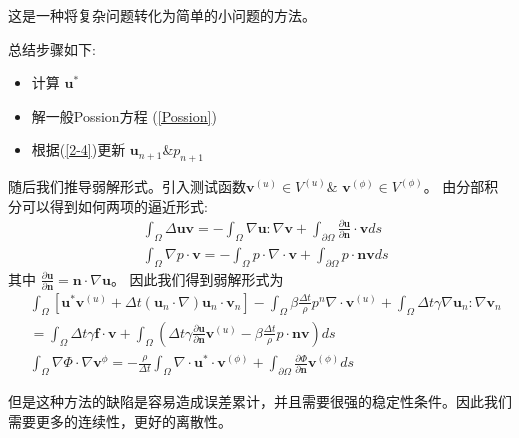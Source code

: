 这是一种将复杂问题转化为简单的小问题的方法。
\begin{tcolorbox}
    总结步骤如下:
    \begin{itemize}
        \item 计算 $\textbf{u}^*$
        \item 解一般Possion方程 (\ref*{Possion})
        \item 根据(\ref{2-4})更新 $\textbf{u}_{n+1}$\&$p_{n+1}$
    \end{itemize}
\end{tcolorbox}


随后我们推导弱解形式。引入测试函数$\textbf{v}^{(u)}\in V^{(u)}$\& $\textbf{v}^{(\phi)}\in V^{(\phi)}$。
由分部积分可以得到如何两项的逼近形式:
$$\begin{aligned}
    &\int_\Omega\Delta \textbf{u}\textbf{v}=-\int_\Omega\nabla\textbf{u}:\nabla\textbf{v}+\int_{\partial\Omega}\frac{\partial \textbf{u}}{\partial \textbf{n}}\cdot \textbf{v}ds\\
    &\int_\Omega \nabla p\cdot \textbf{v}=-\int_\Omega p\cdot \nabla \cdot \textbf{v}+\int_{\partial \Omega}p\cdot\textbf{n}\textbf{v}ds
\end{aligned}$$
其中 $\frac{\partial \textbf{u}}{\partial \textbf{n}}=\textbf{n}\cdot \nabla \textbf{u}$。
因此我们得到弱解形式为
\begin{equation}
    \begin{aligned}
        &\int_\Omega\left[\textbf{u}^*\textbf{v}^{(u)}+\Delta t(\textbf{u}_n\cdot \nabla)\textbf{u}_n\cdot \textbf{v}_n\right]-\int_\Omega\beta \frac{\Delta t}{\rho}p^n\nabla\cdot \textbf{v}^{(u)}
        +\int_\Omega \Delta t\gamma \nabla\textbf{u}_n:\nabla \textbf{v}_n\\
        &=\int_\Omega\Delta t \gamma \textbf{f}\cdot \textbf{v} + \int_\Omega\left(\Delta t\gamma\frac{\partial \textbf{u}}{\partial \textbf{n}}\textbf{v}^{(u)}-\beta\frac{\Delta t}{\rho}p\cdot\textbf{n}\textbf{v}\right)ds\\
        &\int_{\Omega} \nabla \Phi\cdot \nabla \textbf{v}^{\phi}=-\frac{\rho}{\Delta t}\int_\Omega \nabla \cdot \textbf{u}^*\cdot \textbf{v}^{(\phi)}+\int_{\partial\Omega}\frac{\partial \Phi}{\partial \textbf{n}}\textbf{v}^{(\phi)}ds
    \end{aligned}
\end{equation}

但是这种方法的缺陷是容易造成误差累计，并且需要很强的稳定性条件。因此我们需要更多的连续性，更好的离散性。

